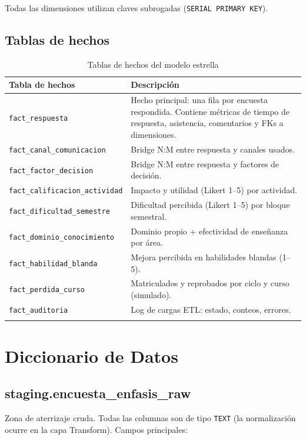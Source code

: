 \documentclass[12pt, letterpaper]{article}
\begin{document}
Todas las dimensiones utilizan claves subrogadas (\texttt{SERIAL PRIMARY KEY}).

\subsection{Tablas de hechos}

\begin{longtable}{lp{8cm}}
\toprule
\textbf{Tabla de hechos} & \textbf{Descripción} \\
\midrule
\endhead
\texttt{fact\_respuesta} & Hecho principal: una fila por encuesta respondida. Contiene métricas de tiempo de respuesta, asistencia, comentarios y FKs a dimensiones. \\
\texttt{fact\_canal\_comunicacion} & Bridge N:M entre respuesta y canales usados. \\
\texttt{fact\_factor\_decision} & Bridge N:M entre respuesta y factores de decisión. \\
\texttt{fact\_calificacion\_actividad} & Impacto y utilidad (Likert 1--5) por actividad. \\
\texttt{fact\_dificultad\_semestre} & Dificultad percibida (Likert 1--5) por bloque semestral. \\
\texttt{fact\_dominio\_conocimiento} & Dominio propio + efectividad de enseñanza por área. \\
\texttt{fact\_habilidad\_blanda} & Mejora percibida en habilidades blandas (1--5). \\
\texttt{fact\_perdida\_curso} & Matriculados y reprobados por ciclo y curso (simulado). \\
\texttt{fact\_auditoria} & Log de cargas ETL: estado, conteos, errores. \\
\bottomrule
\caption{Tablas de hechos del modelo estrella}
\end{longtable}

\section{Diccionario de Datos}

\subsection{staging.encuesta\_enfasis\_raw}

Zona de aterrizaje cruda. Todas las columnas son de tipo \texttt{TEXT} (la normalización ocurre en la capa Transform). Campos principales:
\end{document}
